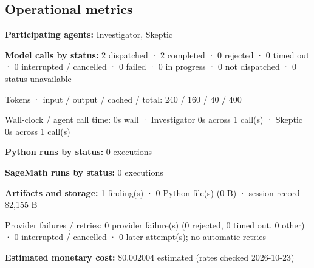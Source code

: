 \documentclass[11pt]{article}
\begin{document}
\subsection{Operational metrics}
\textbf{Participating agents:} Investigator, Skeptic\par
\textbf{Model calls by status:} 2 dispatched · 2 completed · 0 rejected · 0 timed out · 0 interrupted / cancelled · 0 failed · 0 in progress · 0 not dispatched · 0 status unavailable\par
Tokens · input / output / cached / total: 240 / 160 / 40 / 400\par
Wall-clock / agent call time: 0s wall · Investigator 0s across 1 call(s) · Skeptic 0s across 1 call(s)\par
\textbf{Python runs by status:} 0 executions\par
\textbf{SageMath runs by status:} 0 executions\par
\textbf{Artifacts and storage:} 1 finding(s) · 0 Python file(s) (0 B) · session record 82,155 B\par
Provider failures / retries: 0 provider failure(s) (0 rejected, 0 timed out, 0 other) · 0 interrupted / cancelled · 0 later attempt(s); no automatic retries\par
\textbf{Estimated monetary cost:} \$0.002004 estimated (rates checked 2026-10-23)\par
\end{document}
